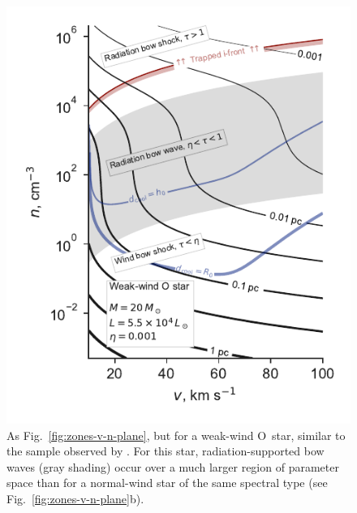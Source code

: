 \begin{figure}
  \includegraphics[width=\linewidth]{figs/zones-v-n-plane-Weak}
  \caption{As Fig.~\ref{fig:zones-v-n-plane}, but for a weak-wind
    O~star, similar to the sample observed by \citet{Martins:2005b}.
    For this star, radiation-supported bow waves (gray shading) occur
    over a much larger region of parameter space than for a
    normal-wind star of the same spectral type
    (see Fig.~\ref{fig:zones-v-n-plane}b).}
  \label{fig:O-weak-wind}
\end{figure}



